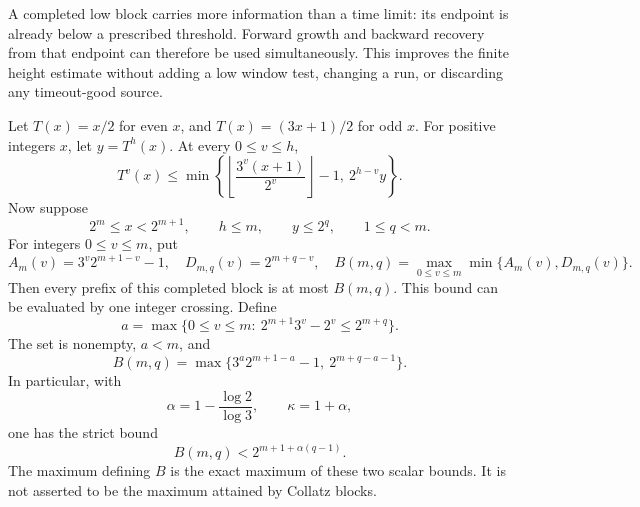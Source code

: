 A completed low block carries more information than a time limit: its
endpoint is already below a prescribed threshold. Forward growth and
backward recovery from that endpoint can therefore be used simultaneously.
This improves the finite height estimate without adding a low window test,
changing a run, or discarding any timeout-good source.

\begin{proposition}
\label{prop:Shaik-completed-block-height}
Let \(T(x)=x/2\) for even \(x\), and \(T(x)=(3x+1)/2\) for odd \(x\).
For positive integers \(x\), let \(y=T^h(x)\). At every \(0\le v\le h\),
\begin{equation}\label{eq:Shaik-two-sided-block-height}
 T^v(x)\le
 \min\left\{\left\lfloor\frac{3^v(x+1)}{2^v}\right\rfloor-1,\
                        2^{h-v}y\right\}.
\end{equation}
Now suppose
\[
 2^m\le x<2^{m+1},\qquad h\le m,\qquad y\le2^q,\qquad 1\le q<m .
\]
For integers \(0\le v\le m\), put
\[
 A_m(v)=3^v2^{m+1-v}-1,\quad D_{m,q}(v)=2^{m+q-v},\quad
 B(m,q)=\max_{0\le v\le m}\min\{A_m(v),D_{m,q}(v)\}.
\]
Then every prefix of this completed block is at most \(B(m,q)\).
This bound can be evaluated by one integer crossing. Define
\begin{equation}\label{eq:Shaik-height-crossing}
 a=\max\{0\le v\le m:\ 2^{m+1}3^v-2^v\le2^{m+q}\}.
\end{equation}
The set is nonempty, \(a<m\), and
\begin{equation}\label{eq:Shaik-height-two-candidates}
 B(m,q)=\max\{3^a2^{m+1-a}-1,\ 2^{m+q-a-1}\}.
\end{equation}
In particular, with
\[
 \alpha=1-\frac{\log2}{\log3},\qquad \kappa=1+\alpha,
\]
one has the strict bound
\begin{equation}\label{eq:Shaik-height-exponent}
 B(m,q)<2^{m+1+\alpha(q-1)}.
\end{equation}
The maximum defining \(B\) is the exact maximum of these two scalar
bounds. It is not asserted to be the maximum attained by Collatz blocks.
\end{proposition}
